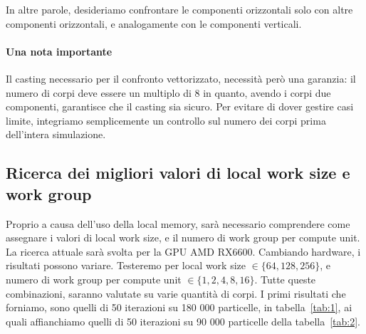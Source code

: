 \documentclass{article}
\begin{document}
	In altre parole, desideriamo confrontare le componenti orizzontali solo con altre componenti orizzontali, e analogamente con le componenti verticali. 
	
	\paragraph{Una nota importante} Il casting necessario per il confronto vettorizzato, necessità però una garanzia: il numero di corpi deve essere un multiplo di 8 in quanto, avendo i corpi due componenti, garantisce che il casting sia sicuro. Per evitare di dover gestire casi limite, integriamo semplicemente un controllo sul numero dei corpi prima dell'intera simulazione.
	

	\subsection{Ricerca dei migliori valori di local work size e work group}
	Proprio a causa dell'uso della local memory, sarà necessario comprendere come assegnare i valori di local work size, e il numero di work group per compute unit. La ricerca attuale sarà svolta per la GPU AMD RX6600. Cambiando hardware, i risultati possono variare. Testeremo per local work size $\in \{64, 128, 256\}$, e numero di work group per compute unit $\in \{1, 2, 4, 8, 16\}$. Tutte queste combinazioni, saranno valutate su varie quantità di corpi.
	I primi risultati che forniamo, sono quelli di 50 iterazioni su 180 000 particelle, in tabella~\ref{tab:1}, ai quali affianchiamo quelli di 50 iterazioni su 90 000 particelle della tabella~\ref{tab:2}.
	
\end{document}
